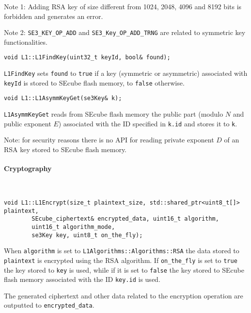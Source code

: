 Note 1: Adding RSA key of size different from 1024, 2048, 4096 and 8192 bits is
forbidden and generates an error.

Note 2: \texttt{SE3\_KEY\_OP\_ADD} and \texttt{SE3\_Key\_OP\_ADD\_TRNG} are
related to symmetric key functionalities.

\begin{lstlisting}
void L1::L1FindKey(uint32_t keyId, bool& found);
\end{lstlisting}

\texttt{L1FindKey} sets \texttt{found} to \texttt{true} if a key (symmetric or
asymmetric) associated with \texttt{keyId} is stored to SEcube flash memory, to
\texttt{false} otherwise.

\begin{lstlisting}
void L1::L1AsymmKeyGet(se3Key& k);
\end{lstlisting}

\texttt{L1AsymmKeyGet} reads from SEcube flash memory the public part (modulo
$N$ and public exponent $E$) associated with the ID specified in \texttt{k.id}
and stores it to \texttt{k}.

\bigskip
Note: for security reasons there is no API for reading private exponent $D$ of
an RSA key stored to SEcube flash memory.

\paragraph{Cryptography} \hspace{0pt} \\
\begin{lstlisting}
void L1::L1Encrypt(size_t plaintext_size, std::shared_ptr<uint8_t[]> plaintext,
        SEcube_ciphertext& encrypted_data, uint16_t algorithm,
        uint16_t algorithm_mode,
        se3Key key, uint8_t on_the_fly);
\end{lstlisting}

When \texttt{algorithm} is set to \texttt{L1Algorithms::Algorithms::RSA} the
data stored to \texttt{plaintext} is encrypted using the RSA algorithm. If
\texttt{on\_the\_fly} is set to \texttt{true} the key stored to \texttt{key} is
used, while if it is set to \texttt{false} the key stored to SEcube flash
memory associated with the ID \texttt{key.id} is used.

The generated ciphertext and other data related to the encryption operation are
outputted to \texttt{encrypted\_data}.

